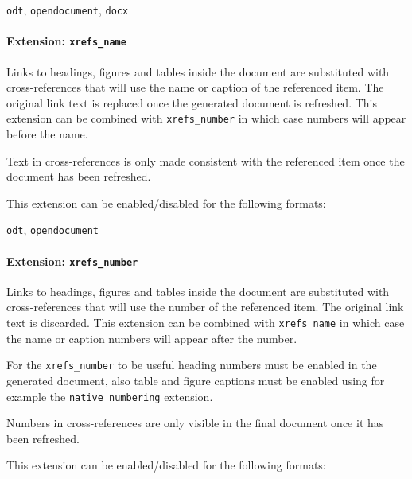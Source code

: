 \documentclass[
]{article}
\providecommand{\tightlist}{%
  \setlength{\itemsep}{0pt}\setlength{\parskip}{0pt}}
\begin{document}
\begin{description}
\tightlist
\item[output formats]
\texttt{odt}, \texttt{opendocument}, \texttt{docx}
\end{description}

\paragraph{\texorpdfstring{Extension:
\texttt{xrefs\_name}}{Extension: xrefs\_name}}\label{extension-xrefs_name}

Links to headings, figures and tables inside the document are
substituted with cross-references that will use the name or caption of
the referenced item. The original link text is replaced once the
generated document is refreshed. This extension can be combined with
\texttt{xrefs\_number} in which case numbers will appear before the
name.

Text in cross-references is only made consistent with the referenced
item once the document has been refreshed.

This extension can be enabled/disabled for the following formats:

\begin{description}
\tightlist
\item[output formats]
\texttt{odt}, \texttt{opendocument}
\end{description}

\paragraph{\texorpdfstring{Extension:
\texttt{xrefs\_number}}{Extension: xrefs\_number}}\label{extension-xrefs_number}

Links to headings, figures and tables inside the document are
substituted with cross-references that will use the number of the
referenced item. The original link text is discarded. This extension can
be combined with \texttt{xrefs\_name} in which case the name or caption
numbers will appear after the number.

For the \texttt{xrefs\_number} to be useful heading numbers must be
enabled in the generated document, also table and figure captions must
be enabled using for example the \texttt{native\_numbering} extension.

Numbers in cross-references are only visible in the final document once
it has been refreshed.

This extension can be enabled/disabled for the following formats:
\end{document}
